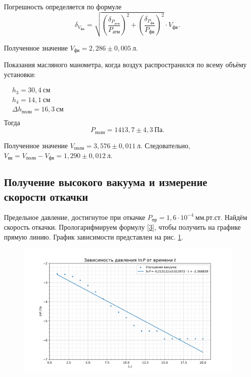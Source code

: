 \documentclass[a4paper, 12pt]{article}
\begin{document}
Погрешность определяется по формуле
\[\delta_{V_{фв}} = \sqrt{\left(\frac{\delta_{P_{атм}}}{P_{атм}}\right)^2 + \left(\frac{\delta_{P_{фв}}}{P_{фв}}\right)^2} \cdot V_{фв}.\]

Полученное значение $V_{фв} = 2,286\pm0,005~л$.

Показания масляного манометра, когда воздух распространился по всему объёму установки:

$\begin{aligned}
& h_3 = 30,4~см \\
& h_4 = 14,1~см \\
& \Delta{h_{полн}} = 16,3~см \\
\end{aligned}$\\[0,5 cm]

Тогда
\[P_{полн} = 1413,7\pm4,3~Па.\]

Полученное значение $V_{полн} =3,576\pm0,011~л$. Следовательно, $V_{вв} = V_{полн} - V_{фв} = 1,290\pm0,012~л$.

\subsection{Получение высокого вакуума и измерение скорости откачки}

Предельное давление, достигнутое при откачке $P_{пр} = 1,6 \cdot 10^{-4}~мм.рт.ст.$ Найдём скорость откачки. Прологарифмируем формулу \eqref{3}, чтобы получить на графике прямую линию. График зависимости представлен на рис. \ref{ris3}.

\begin{figure}[h!]
\begin{flushleft}
    \includegraphics[scale=0.75]{2.3.1_1.png}
\end{flushleft}
\caption{}
\label{ris3}
\end{figure}
\end{document}
